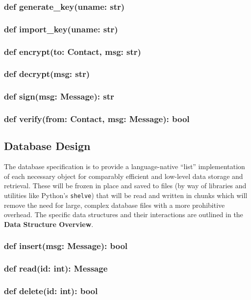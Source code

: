 \documentclass[titlepage]{report}
\begin{document}
\subsubsection{def generate\_key(uname: str)}
\subsubsection{def import\_key(uname: str)}
\subsubsection{def encrypt(to: Contact, msg: str)}
\subsubsection{def decrypt(msg: str)}
\subsubsection{def sign(msg: Message): str}
\subsubsection{def verify(from: Contact, msg: Message): bool}

\subsection{Database Design}
The database specification is to provide a language-native ``list'' implementation of each necessary object for comparably efficient and low-level data storage and retrieval. These will be frozen in place and saved to files (by way of libraries and utilities like Python's \texttt{shelve}) that will be read and written in chunks which will remove the need for large, complex database files with a more prohibitive overhead. The specific data structures and their interactions are outlined in the \textbf{Data Structure Overview}.

\subsubsection{def insert(msg: Message): bool}
\subsubsection{def read(id: int): Message}
\subsubsection{def delete(id: int): bool}
\end{document}

